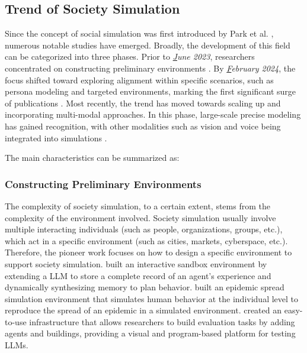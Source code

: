 \subsection{Trend of Society Simulation}
Since the concept of social simulation was first introduced by Park et al. \cite{park2022social}, numerous notable studies have emerged. Broadly, the development of this field can be categorized into three phases. Prior to \textit{{\ul June 2023}}, researchers concentrated on constructing preliminary environments \cite{park2023generative,williams2023epidemic,lin2023agentsims}. By \textit{{\ul February 2024}}, the focus shifted toward exploring alignment within specific scenarios, such as persona modeling and targeted environments, marking the first significant surge of publications \cite{gao2023s3,wang2023avalons,li2024econagent}. Most recently, the trend has moved towards scaling up and incorporating multi-modal approaches. In this phase, large-scale precise modeling has gained recognition, with other modalities such as vision and voice being integrated into simulations \cite{mou2024unveiling,ren2024emergence,wu2024enhance,wang2024grutopia}.

The main characteristics can be summarized as:
\subsubsection{Constructing Preliminary Environments}
The complexity of society simulation, to a certain extent, stems from the complexity of the environment involved. Society simulation usually involve multiple interacting individuals (such as people, organizations, groups, etc.), which act in a specific environment (such as cities, markets, cyberspace, etc.). Therefore, the pioneer work focuses on how to design a specific environment to support society simulation. \cite{park2023generative} built an interactive sandbox environment by extending a LLM to store a complete record of an agent's experience and dynamically synthesizing memory to plan behavior. \cite{williams2023epidemic} built an epidemic spread simulation environment that simulates human behavior at the individual level to reproduce the spread of an epidemic in a simulated environment. \cite{lin2023agentsims} created an easy-to-use infrastructure that allows researchers to build evaluation tasks by adding agents and buildings, providing a visual and program-based platform for testing LLMs.

